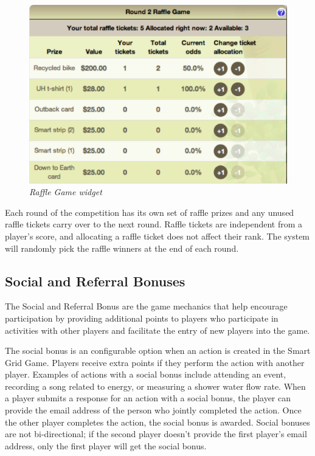 \begin{figure}[th]
  \center
  \includegraphics[width=0.95\columnwidth]{raffle-small.eps}
  \caption{\em Raffle Game widget}
  \label{fig:RaffleGame}
\end{figure}

Each round of the competition has its own set of raffle prizes and any unused raffle tickets carry over to the next round. Raffle tickets are independent from a player's score, and allocating a raffle ticket does not affect their rank. The system will randomly pick the raffle winners at the end of each round.

\subsection{Social and Referral Bonuses}

The Social and Referral Bonus are the game mechanics that help encourage participation by providing additional points to players who participate in activities with other players and facilitate the entry of new players into the game.

The social bonus is an configurable option when an action is created in the Smart Grid Game. Players receive extra points if they perform the action with another player. Examples of actions with a social bonus include attending an event, recording a song related to energy, or measuring a shower water flow rate. When a player submits a response for an action with a social bonus, the player can provide the email address of the person who jointly completed the action. Once the other player completes the action, the social bonus is awarded. Social bonuses are not bi-directional; if the second player doesn't provide the first player's email address, only the first player will get the social bonus.

